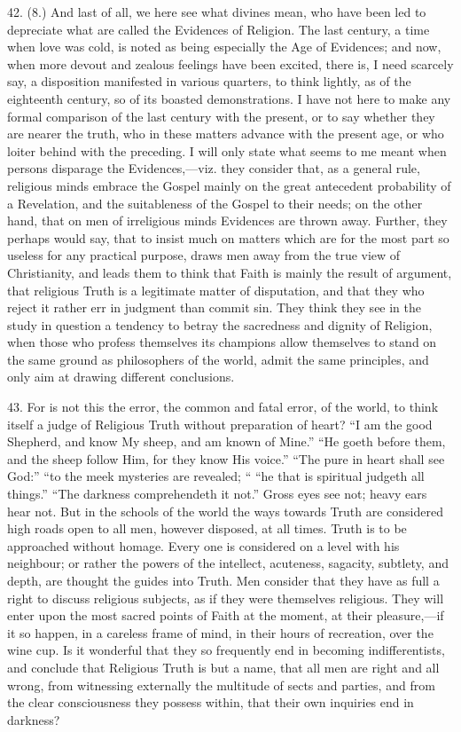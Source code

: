 42. (8.) And last of all, we here see what divines mean, who have
been led to depreciate what are called the Evidences of Religion. The
last century, a time when love was cold, is noted as being especially
the Age of Evidences; and now, when more devout and zealous feelings
have been excited, there is, I need scarcely say, a disposition
manifested in various quarters, to think lightly, as of the eighteenth
century, so of its boasted demonstrations. I have not here to make any
formal comparison of the last century with the present, or to say
whether they are nearer the truth, who in these matters advance with
the present age, or who loiter behind with the preceding. I will only
state what seems to me meant when persons disparage the Evidences,—viz.
they consider that, as a general rule, religious minds embrace the
Gospel mainly on the great antecedent probability of a Revelation, and
the suitableness of the Gospel to their needs; on the other hand, that
on men of irreligious minds Evidences are thrown away. Further, they
perhaps would say, that to insist much on matters which are for the
most part so useless for any practical purpose, draws men away from
the true view of Christianity, and leads them to think that Faith is
mainly the result of argument, that religious Truth is a legitimate
matter of disputation, and that they who reject it rather err in
judgment than commit sin. They think they see in the study in question
a tendency to betray the sacredness and dignity of Religion, when
those who profess themselves its champions allow themselves to stand
on the same ground as philosophers of the world, admit the same
principles, and only aim at drawing different conclusions.

43. For is not this the error, the common and fatal error, of the
world, to think itself a judge of Religious Truth without preparation
of heart? ``I am the good Shepherd, and know My sheep, and am
known of Mine.'' ``He goeth before them, and the sheep follow
Him, for they know His voice.'' ``The pure in heart shall see
God:'' ``to the meek mysteries are revealed; `` ``he
that is spiritual judgeth all things.'' ``The darkness
comprehendeth it not.'' Gross eyes see not; heavy ears hear not.
But in the schools of the world the ways towards Truth are considered
high roads open to all men, however disposed, at all times. Truth is
to be approached without homage. Every one is considered on a level
with his neighbour; or rather the powers of the intellect, acuteness,
sagacity, subtlety, and depth, are thought the guides into Truth. Men
consider that they have as full a right to discuss religious subjects,
as if they were themselves religious. They will enter upon the most
sacred points of Faith at the moment, at their pleasure,—if it so
happen, in a careless frame of mind, in their hours of recreation,
over the wine cup. Is it wonderful that they so frequently end in
becoming indifferentists, and conclude that Religious Truth is but a
name, that all men are right and all wrong, from witnessing externally
the multitude of sects and parties, and from the clear consciousness
they possess within, that their own inquiries end in darkness?

